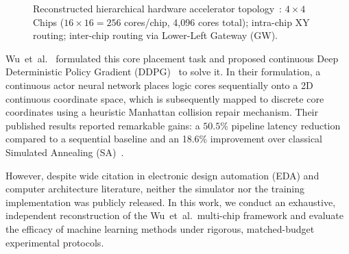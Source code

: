 \documentclass[10pt,conference]{IEEEtran}
\begin{document}
\begin{figure}[t]
  \centering
  \caption{Reconstructed hierarchical hardware accelerator topology~\cite{wu2020todaes}: $4 \times 4$ Chips ($16 \times 16 = 256$ cores/chip, 4,096 cores total); intra-chip XY routing; inter-chip routing via Lower-Left Gateway (GW).}
  \label{fig:hardware-topo}
\end{figure}

Wu~et~al.~\cite{wu2020todaes} formulated this core placement task and proposed continuous Deep Deterministic Policy Gradient (DDPG)~\cite{lillicrap2016ddpg} to solve it. In their formulation, a continuous actor neural network places logic cores sequentially onto a 2D continuous coordinate space, which is subsequently mapped to discrete core coordinates using a heuristic Manhattan collision repair mechanism. Their published results reported remarkable gains: a $50.5\%$ pipeline latency reduction compared to a sequential baseline and an 18.6\% improvement over classical Simulated Annealing (SA)~\cite{kirkpatrick1983sa}.

However, despite wide citation in electronic design automation (EDA) and computer architecture literature, neither the simulator nor the training implementation was publicly released. In this work, we conduct an exhaustive, independent reconstruction of the Wu~et~al.\ multi-chip framework and evaluate the efficacy of machine learning methods under rigorous, matched-budget experimental protocols.
\end{document}

